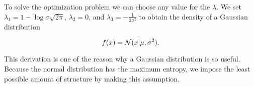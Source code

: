 
To solve the optimization problem we can choose any value for the $\lambda$. We
set $\lambda_1 = 1 - \log \sigma \sqrt{2 \pi}$, $\lambda_2 = 0$, and $\lambda_3
= - \frac{1}{2 \sigma^2}$ to obtain the density of a Gaussian distribution

\begin{equation}
  f(x) = {\mathcal{N}}(x | \mu, \sigma^2).
\end{equation}

This derivation is one of the reason why a Gaussian distribution is so useful.
 Because the normal distribution has the maximum
entropy, we impose the least possible amount of structure by making this
assumption.

